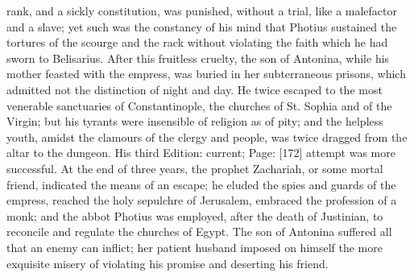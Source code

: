 rank, and a sickly constitution, was punished, without a trial, like a malefactor and a slave; yet such was the constancy of his mind that Photius sustained the tortures of the scourge and the rack without violating the faith which he had sworn to Belisarius. After this fruitless cruelty, the son of Antonina, while his mother feasted with the empress, was buried in her subterraneous prisons, which admitted not the distinction of night and day. He twice escaped to the most venerable sanctuaries of Constantinople, the churches of St. Sophia and of the Virgin; but his tyrants were insensible of religion as of pity; and the helpless youth, amidst the clamours of the clergy and people, was twice dragged from the altar to the dungeon. His third Edition: current; Page: [172] attempt was more successful. At the end of three years, the prophet Zachariah, or some mortal friend, indicated the means of an escape; he eluded the spies and guards of the empress, reached the holy sepulchre of Jerusalem, embraced the profession of a monk; and the abbot Photius was employed, after the death of Justinian, to reconcile and regulate the churches of Egypt. The son of Antonina suffered all that an enemy can inflict; her patient husband imposed on himself the more exquisite misery of violating his promise and deserting his friend.

